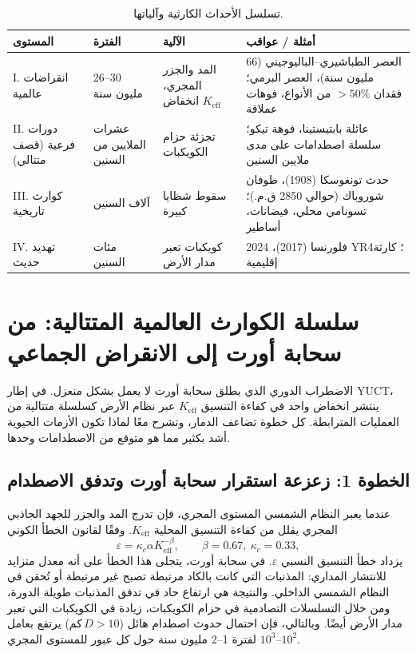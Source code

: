 \documentclass[11pt,a4paper]{article}
\begin{document}
	\begin{table}[!ht]
		\centering
		\caption{تسلسل الأحداث الكارثية وآلياتها.}
		\label{tab:hierarchy}
		\scriptsize
		\begin{tabular}{p{3.5cm}p{2.4cm}p{3.4cm}p{7.5cm}}
			\toprule
			\textbf{المستوى} & \textbf{الفترة} & \textbf{الآلية} & \textbf{أمثلة / عواقب} \\
			\midrule
			I. انقراضات عالمية & 26–30 مليون سنة & المد والجزر المجري، انخفاض \(K_{\mathrm{eff}}\) & العصر الطباشيري–الباليوجيني (66 مليون سنة)، العصر البرمي؛ فقدان \(>50\%\) من الأنواع، فوهات عملاقة \\
			II. دورات فرعية (قصف متتالي) & عشرات الملايين من السنين & تجزئة حزام الكويكبات & عائلة بابتيستينا، فوهة تيكو؛ سلسلة اصطدامات على مدى ملايين السنين \\
			III. كوارث تاريخية & آلاف السنين & سقوط شظايا كبيرة & حدث تونغوسكا (1908)، طوفان شوروباك (حوالي 2850 ق.م.)؛ تسونامي محلي، فيضانات، أساطير \\
			IV. تهديد حديث & مئات السنين & كويكبات تعبر مدار الأرض & فلورنسا (2017)، 2024 YR4؛ كارثة إقليمية \\
			\bottomrule
		\end{tabular}
	\end{table}
	
	\section{سلسلة الكوارث العالمية المتتالية: من سحابة أورت إلى الانقراض الجماعي}
	
	الاضطراب الدوري الذي يطلق سحابة أورت لا يعمل بشكل منعزل. 
	في إطار YUCT، ينتشر انخفاض واحد في كفاءة التنسيق \(K_{\mathrm{eff}}\) عبر نظام الأرض كسلسلة متتالية من العمليات المترابطة. 
	كل خطوة تضاعف الدمار، وتشرح معًا لماذا تكون الأزمات الحيوية أشد بكثير مما هو متوقع من الاصطدامات وحدها.
	
	\subsection{الخطوة 1: زعزعة استقرار سحابة أورت وتدفق الاصطدام}
	
	عندما يعبر النظام الشمسي المستوى المجري، فإن تدرج المد والجزر للجهد الجاذبي المجري يقلل من كفاءة التنسيق المحلية \(K_{\mathrm{eff}}\). وفقًا لقانون الخطأ الكوني
	\begin{equation}
		\varepsilon = \kappa_c \alpha K_{\mathrm{eff}}^{-\beta},\qquad \beta=0.67,\ \kappa_c=0.33,
	\end{equation}
	يزداد خطأ التنسيق النسبي \(\varepsilon\). في سحابة أورت، يتجلى هذا الخطأ على أنه معدل متزايد للانتشار المداري: المذنبات التي كانت بالكاد مرتبطة تصبح غير مرتبطة أو تُحقن في النظام الشمسي الداخلي. والنتيجة هي ارتفاع حاد في تدفق المذنبات طويلة الدورة، ومن خلال التسلسلات التصادمية في حزام الكويكبات، زيادة في الكويكبات التي تعبر مدار الأرض أيضًا. وبالتالي، فإن احتمال حدوث اصطدام هائل (\(D>10\) كم) يرتفع بعامل \(10^2\)–\(10^3\) لفترة 1–2 مليون سنة حول كل عبور للمستوى المجري.
	
\end{document}
